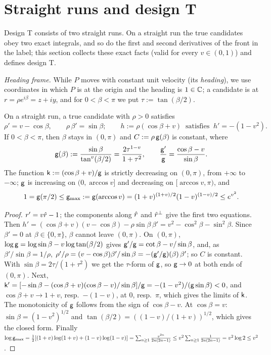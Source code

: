 \section{Straight runs and design T}\label{sec:designT}

Design T consists of two straight runs. On a straight run the true candidates obey two exact integrals, and so do the first and
second derivatives of the front in the label; this section collects these exact facts (valid for every $v\in(0,1)$) and defines
design T.

\emph{Heading frame.} While $P$ moves with constant unit velocity (its \emph{heading}), we use coordinates in which $P$ is at the
origin and the heading is $1\in\mathbb{C}$; a candidate is at $r=\rho e^{i\beta}=z+iy$, and for $0<\beta<\pi$ we put $\tau:=\tan(\beta/2)$.

\begin{proposition}\label{prop:runs}
On a straight run, a true candidate with $\rho>0$ satisfies
\[
\rho'=v-\cos\beta,\qquad\rho\,\beta'=\sin\beta;\qquad h:=\rho(\cos\beta+v)\ \text{ satisfies }\ h'=-(1-v^2).
\]
If $0<\beta<\pi$, then $\beta$ stays in $(0,\pi)$ and $C:=\rho\,\mathsf g(\beta)$ is constant, where
\[
\mathsf g(\beta):=\frac{\sin\beta}{\tan^v(\beta/2)}=\frac{2\tau^{1-v}}{1+\tau^2},\qquad\frac{\mathsf g'}{\mathsf g}=\frac{\cos\beta-v}{\sin\beta}.
\]
The function $\mathsf k:=(\cos\beta+v)/\mathsf g$ is strictly decreasing on $(0,\pi)$, from $+\infty$ to $-\infty$; $\mathsf g$ is increasing on
$(0,\arccos v]$ and decreasing on $[\arccos v,\pi)$, and
\[
1=\mathsf g(\pi/2)\le\mathsf g_{\max}:=\mathsf g(\arccos v)=(1+v)^{(1+v)/2}(1-v)^{(1-v)/2}\le e^{v^2}.
\]
\end{proposition}
\begin{proof}
$r'=v\hat r-1$; the components along $\hat r$ and $\hat r^\perp$ give the first two equations. Then
$h'=(\cos\beta+v)(v-\cos\beta)-\rho\sin\beta\,\beta'=v^2-\cos^2\beta-\sin^2\beta$. Since $\beta'=0$ at $\beta\in\{0,\pi\}$, $\beta$
cannot leave $(0,\pi)$. On $(0,\pi)$, $\log\mathsf g=\log\sin\beta-v\log\tan(\beta/2)$ gives $\mathsf g'/\mathsf g=\cot\beta-v/\sin\beta$, and, as $\beta'/\sin\beta=1/\rho$,
$\rho'/\rho=(v-\cos\beta)\beta'/\sin\beta=-(\mathsf g'/\mathsf g)(\beta)\,\beta'$; so $C$ is constant. With $\sin\beta=2\tau/(1+\tau^2)$ we get the $\tau$-form of $\mathsf g$, so $\mathsf g\to0$ at
both ends of $(0,\pi)$. Next,
$\mathsf k'=[-\sin\beta-(\cos\beta+v)(\cos\beta-v)/\sin\beta]/\mathsf g=-(1-v^2)/(\mathsf g\sin\beta)<0$, and $\cos\beta+v\to1+v$, resp.\ $-(1-v)$,
at $0$, resp.\ $\pi$, which gives the limits of $\mathsf k$. The monotonicity of $\mathsf g$ follows from the sign of $\cos\beta-v$. At
$\cos\beta=v$: $\sin\beta=(1-v^2)^{1/2}$ and $\tan(\beta/2)=((1-v)/(1+v))^{1/2}$, which gives the closed form. Finally
$\log\mathsf g_{\max}=\frac12[(1+v)\log(1+v)+(1-v)\log(1-v)]=\sum_{n\ge1}\frac{v^{2n}}{2n(2n-1)}\le v^2\sum_{n\ge1}\frac1{2n(2n-1)}=v^2\log2\le v^2$.
\end{proof}

